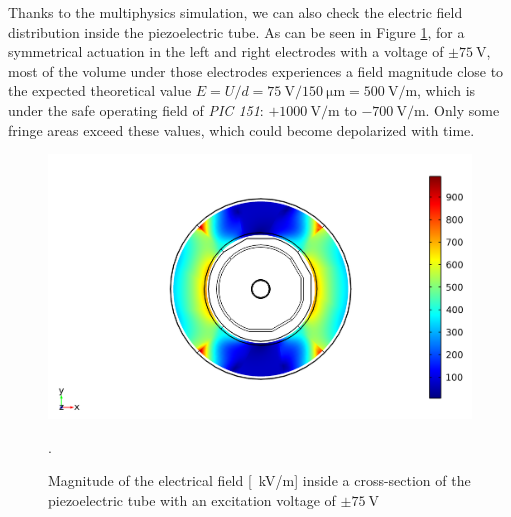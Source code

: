Thanks to the multiphysics simulation, we can also check the electric field distribution inside the piezoelectric tube. As can be seen in Figure \ref{fig:field}, for a symmetrical actuation in the left and right electrodes with a voltage of $\pm \SI{75}{\volt}$, most of the volume under those electrodes experiences a field magnitude close to the expected theoretical value $E=U/d = \SI{75}{\volt}/\SI{150}{\micro\meter} = \SI{500}{\volt/\meter}$, which is under the safe operating field of \textit{PIC 151}: $ +\SI{1000}{\volt/\meter}$ to $ -\SI{700}{\volt/\meter}$. Only some fringe areas exceed these values, which could become depolarized with time.
\begin{figure}[h!]\centering
      \includegraphics[width=10 cm]{figures/30_DesignSimulation/Mechanical/field.png}
      \caption{Magnitude of the electrical field [\SI{}{\kilo \volt / \meter}] inside a cross-section of the piezoelectric tube with an excitation voltage of $\pm \SI{75}{\volt}$}.
      \label{fig:field}
\end{figure}





